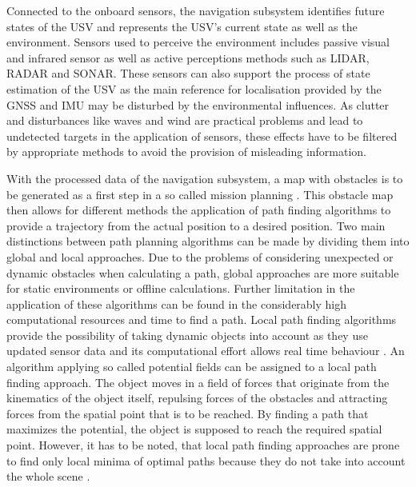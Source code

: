    Connected to the onboard sensors, the navigation subsystem identifies future states of the \ac{USV} and represents the \ac{USV}'s current state as well as the environment. Sensors used to perceive the environment includes passive visual and infrared sensor as well as active perceptions methods such as \ac{LIDAR}, \ac{RADAR} and \ac{SONAR}. These sensors can also support the process of state estimation of the \ac{USV} as the main reference for localisation provided by the \ac{GNSS} and \ac{IMU} may be disturbed by the environmental influences. As clutter and disturbances like waves and wind are practical problems and lead to undetected targets in the application of sensors, these effects have to be filtered by appropriate methods to avoid the provision of misleading information.
   
   With the processed data of the navigation subsystem, a map with obstacles is to be generated as a first step in a so called mission planning \cite{Liu2016}. This obstacle map then allows for different methods the application of path finding algorithms to provide a trajectory from the actual position to a desired position. Two main distinctions between path planning algorithms can be made by dividing them into global and local approaches. Due to the problems of considering unexpected or dynamic obstacles when calculating a path, global approaches are more suitable for static environments or offline calculations. Further limitation in the application of these algorithms can be found in the considerably high computational resources and time to find a path. Local path finding algorithms provide the possibility of taking dynamic objects into account as they use updated sensor data and its computational effort allows real time behaviour \cite{EnvPerc}. An algorithm applying so called potential fields can be assigned to a local path finding approach. The object moves in a field of forces that originate from the kinematics of the object itself, repulsing forces of the obstacles and attracting forces from the spatial point that is to be reached. By finding a path that maximizes the potential, the object is supposed to reach the required spatial point. However, it has to be noted, that local path finding approaches are prone to find only local minima of optimal paths because they do not take into account the whole scene \cite{PotField}.
   

